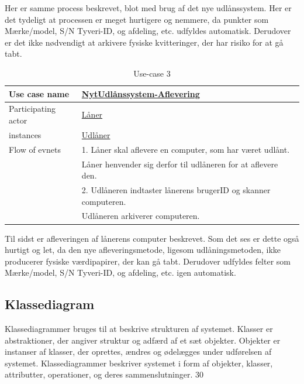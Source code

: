 \documentclass[a4paper]{article}
\begin{document}
Her er samme process beskrevet, blot med brug af det nye udlånssystem. Her er det tydeligt at processen er meget hurtigere og nemmere, da punkter som Mærke/model, S/N Tyveri-ID, og afdeling, etc. udfyldes automatisk. Derudover er det ikke nødvendigt at arkivere fysiske kvitteringer, der har risiko for at gå tabt.
\newpage
\begin{table}[h]
\caption{Use-case 3}
\begin{tabular}{ll}
Use case name               & \underline{NytUdlånssystem-Aflevering} \\ \hline
Participating actor           & \underline{Låner} \\
instances                     & \underline{Udlåner}\\ \hline
Flow of evnets                & 1. Låner skal aflevere en computer, som har været udlånt.
\\& Låner henvender sig derfor til udlåneren for at aflevere den.
\\& 2. Udlåneren indtaster lånerens brugerID og skanner computeren.
\\& Udlåneren arkiverer computeren.
\end{tabular}
\end{table}
Til sidst er afleveringen af lånerens computer beskrevet. Som det ses er dette også hurtigt og let, da den nye afleveringsmetode, ligesom udlåningsmetoden, ikke producerer fysiske værdipapirer, der kan gå tabt. Derudover udfyldes felter som Mærke/model, S/N Tyveri-ID, og afdeling, etc. igen automatisk. \\
\subsection{Klassediagram}
Klassediagrammer bruges til at beskrive strukturen af systemet. Klasser er abstraktioner, der angiver struktur og adfærd af et sæt objekter. Objekter er instanser af klasser, der oprettes, ændres og ødelægges under udførelsen af systemet. Klassediagrammer beskriver systemet i form af objekter, klasser, attributter, operationer, og deres sammenslutninger. \cite{OOSE}{30}
\end{document}
